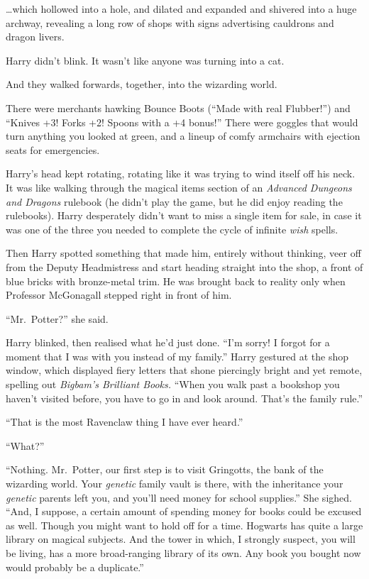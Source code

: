 \ldots{}which hollowed into a hole, and dilated and expanded and
shivered into a huge archway, revealing a long row of shops with signs
advertising cauldrons and dragon livers.

Harry didn't blink. It wasn't like anyone was turning into a cat.

And they walked forwards, together, into the wizarding world.

There were merchants hawking Bounce Boots (``Made with real Flubber!'')
and ``Knives +3! Forks +2! Spoons with a +4 bonus!'' There were goggles
that would turn anything you looked at green, and a lineup of comfy
armchairs with ejection seats for emergencies.

Harry's head kept rotating, rotating like it was trying to wind itself
off his neck. It was like walking through the magical items section of
an \emph{Advanced Dungeons and Dragons} rulebook (he didn't play the
game, but he did enjoy reading the rulebooks). Harry desperately didn't
want to miss a single item for sale, in case it was one of the three you
needed to complete the cycle of infinite \emph{wish} spells.

Then Harry spotted something that made him, entirely without thinking,
veer off from the Deputy Headmistress and start heading straight into
the shop, a front of blue bricks with bronze-metal trim. He was brought
back to reality only when Professor McGonagall stepped right in front of
him.

``Mr.~Potter?'' she said.

Harry blinked, then realised what he'd just done. ``I'm sorry! I forgot
for a moment that I was with you instead of my family.'' Harry gestured
at the shop window, which displayed fiery letters that shone piercingly
bright and yet remote, spelling out \emph{Bigbam's Brilliant Books.}
``When you walk past a bookshop you haven't visited before, you have to
go in and look around. That's the family rule.''

``That is the most Ravenclaw thing I have ever heard.''

``What?''

``Nothing. Mr.~Potter, our first step is to visit Gringotts, the bank of
the wizarding world. Your \emph{genetic} family vault is there, with the
inheritance your \emph{genetic} parents left you, and you'll need money
for school supplies.'' She sighed. ``And, I suppose, a certain amount of
spending money for books could be excused as well. Though you might want
to hold off for a time. Hogwarts has quite a large library on magical
subjects. And the tower in which, I strongly suspect, you will be
living, has a more broad-ranging library of its own. Any book you bought
now would probably be a duplicate.''

